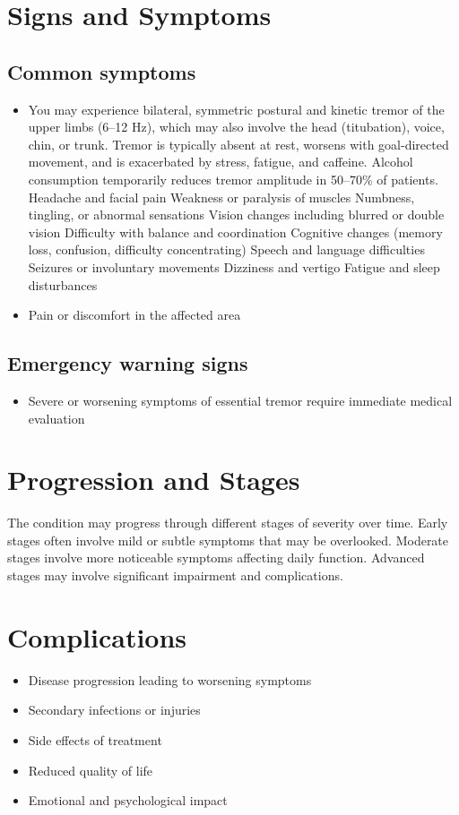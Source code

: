 \section{Signs and Symptoms}
\subsection{Common symptoms}
\begin{itemize}[noitemsep]
  \item You may experience bilateral, symmetric postural and kinetic tremor of the upper limbs (6--12 Hz), which may also involve the head (titubation), voice, chin, or trunk. Tremor is typically absent at rest, worsens with goal-directed movement, and is exacerbated by stress, fatigue, and caffeine. Alcohol consumption temporarily reduces tremor amplitude in 50--70\% of patients. Headache and facial pain Weakness or paralysis of muscles Numbness, tingling, or abnormal sensations Vision changes including blurred or double vision Difficulty with balance and coordination Cognitive changes (memory loss, confusion, difficulty concentrating) Speech and language difficulties Seizures or involuntary movements Dizziness and vertigo Fatigue and sleep disturbances
  \item Pain or discomfort in the affected area
  \end{itemize}
\subsection{Emergency warning signs}
\begin{itemize}[noitemsep]
  \item Severe or worsening symptoms of essential tremor require immediate medical evaluation
\end{itemize}
\section{Progression and Stages}
The condition may progress through different stages of severity over time. Early stages often involve mild or subtle symptoms that may be overlooked. Moderate stages involve more noticeable symptoms affecting daily function. Advanced stages may involve significant impairment and complications.
\section{Complications}
\begin{itemize}[noitemsep]
  \item Disease progression leading to worsening symptoms
  \item Secondary infections or injuries
  \item Side effects of treatment
  \item Reduced quality of life
  \item Emotional and psychological impact
\end{itemize}
